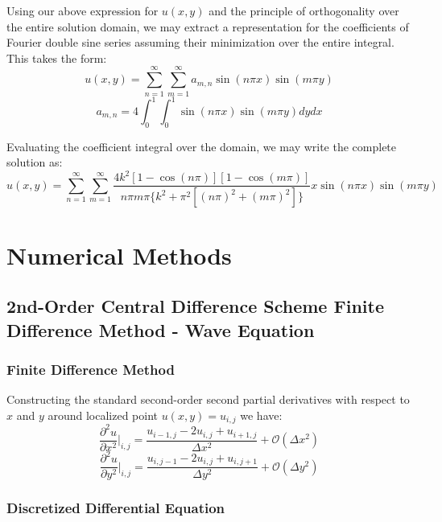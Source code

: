 \documentclass[10pt]{article}		%
\numberwithin{equation}{section}
\newcommand{\psder}[2]{\dfrac{\partial^2#1}{\partial#2^2}}		%
\begin{document}
Using our above expression for $u(x,y)$ and the principle of orthogonality over the entire solution domain, we may extract a representation for the coefficients of Fourier double sine series assuming their minimization over the entire integral. This takes the form:
\begin{equation}
u(x,y) = \sum_{n=1}^{\infty} \sum_{m=1}^{\infty} a_{m,n} \sin(n\pi x)\sin(m\pi y)
\end{equation}
\begin{equation}
a_{m,n} = 4 \int_{0}^{1} \int_{0}^{1} \sin(n\pi x)\sin(m\pi y) dy dx
\end{equation}

Evaluating the coefficient integral over the domain, we may write the complete solution as:
\begin{equation}
u(x,y) = \sum_{n=1}^{\infty} \sum_{m=1}^{\infty} \frac{4k^2[1-\cos(n\pi)][1-\cos(m\pi)]}{n\pi m\pi\{k^2+\pi^2[(n\pi)^2+(m\pi)^2]\}}  x\sin(n\pi x)\sin(m\pi y)
\end{equation}

\newpage

\section{Numerical Methods}

\subsection{2nd-Order Central Difference Scheme Finite Difference Method - Wave Equation}

\subsubsection{Finite Difference Method}

Constructing the standard second-order second partial derivatives with respect to $x$ and $y$ around localized point $u(x,y)=u_{i,j}$ we have:
\begin{equation}
\label{eqn:2ox}
\psder{u}{x}\Big|_{i,j} = \frac{u_{i-1, j} - 2u_{i,j} + u_{i+1, j}}{\Delta x^2} + \mathcal{O}(\Delta x^2)
\end{equation}
\begin{equation}
\label{eqn:2oy}
\psder{u}{y}\Big|_{i,j} = \frac{u_{i, j-1} - 2u_{i,j} + u_{i, j+1}}{\Delta y^2} + \mathcal{O}(\Delta y^2)
\end{equation}

\subsubsection{Discretized Differential Equation}
\end{document}
